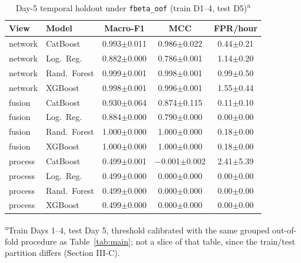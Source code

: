 \documentclass[conference]{IEEEtran}
\begin{document}
\begin{table}[t]
\caption{Day-5 temporal holdout under \texttt{fbeta\_oof} (train D1--4, test D5)\textsuperscript{a}}
\label{tab:day5}
\centering
\scriptsize
\begin{tabular}{llccc}
\toprule
View & Model & Macro-F1 & MCC & FPR/hour \\
\midrule
network & CatBoost      & 0.993$\pm$0.011 & 0.986$\pm$0.022 & 0.44$\pm$0.21 \\
network & Log.\ Reg.    & 0.882$\pm$0.000 & 0.786$\pm$0.001 & 1.14$\pm$0.20 \\
network & Rand.\ Forest & 0.999$\pm$0.001 & 0.998$\pm$0.001 & 0.99$\pm$0.50 \\
network & XGBoost       & 0.998$\pm$0.001 & 0.996$\pm$0.001 & 1.55$\pm$0.44 \\
fusion  & CatBoost      & 0.930$\pm$0.064 & 0.874$\pm$0.115 & 0.11$\pm$0.10 \\
fusion  & Log.\ Reg.    & 0.884$\pm$0.000 & 0.790$\pm$0.000 & 0.00$\pm$0.00 \\
fusion  & Rand.\ Forest & 1.000$\pm$0.000 & 1.000$\pm$0.000 & 0.18$\pm$0.00 \\
fusion  & XGBoost       & 1.000$\pm$0.000 & 1.000$\pm$0.000 & 0.18$\pm$0.00 \\
process & CatBoost      & 0.499$\pm$0.001 & $-$0.001$\pm$0.002 & 2.41$\pm$5.39 \\
process & Log.\ Reg.    & 0.499$\pm$0.000 & 0.000$\pm$0.000 & 0.00$\pm$0.00 \\
process & Rand.\ Forest & 0.499$\pm$0.000 & 0.000$\pm$0.000 & 0.00$\pm$0.00 \\
process & XGBoost       & 0.499$\pm$0.000 & 0.000$\pm$0.000 & 0.00$\pm$0.00 \\
\bottomrule
\end{tabular}

\vspace{2pt}
\raggedright\footnotesize\textsuperscript{a}Train Days 1--4, test Day 5, threshold calibrated with the
same grouped out-of-fold procedure as Table~\ref{tab:main}; not a slice of that table, since the
train/test partition differs (Section III-C).
\end{table}
\end{document}
